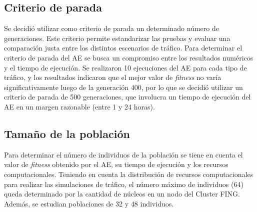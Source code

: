 \subsection{Criterio de parada}
Se decidió utilizar como criterio de parada un determinado número de generaciones. Este criterio permite estandarizar las pruebas y evaluar una comparación justa entre los distintos escenarios de tráfico. Para determinar el 
criterio de parada del AE se busca un compromiso entre los resultados numéricos y el tiempo de ejecución. 
Se realizaron 10 ejecuciones del AE para cada tipo de tráfico, y los resultados indicaron que el mejor valor de \emph{fitness} no varía significativamente luego de la generación 400, por lo que se decidió utilizar un criterio de parada de 500 generaciones, que involucra un tiempo de ejecución del AE en un margen razonable (entre 1 y 24 horas). 



\subsection{Tamaño de la población}

Para determinar el número de individuos de la población 
se tiene en cuenta
el valor de \emph{fitness} obtenido por el AE, su tiempo de ejecución y los recursos 
computacionales. 
Teniendo en cuenta la distribución de recursos computacionales para realizar las simulaciones de tráfico, el número máximo de individuos (64) queda determinado por la cantidad 
de núcleos en un nodo del Cluster FING. Además, se estudian poblaciones de 32 y 48 individuos.

